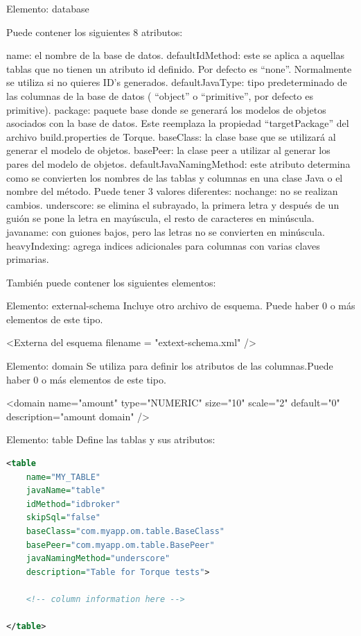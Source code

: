\documentclass[12pt, oneside]{article}
\begin{document}
Elemento: database

Puede contener los siguientes 8 atributos:

name: el nombre de la base de datos.
defaultIdMethod: este se aplica a aquellas tablas que no tienen un atributo id definido. Por defecto es “none”. Normalmente se utiliza si no quieres ID’s generados.
defaultJavaType: tipo predeterminado de las columnas de la base de datos ( “object” o “primitive”, por defecto es primitive).
package: paquete base donde se generará los modelos de objetos asociados con la base de datos. Este reemplaza la propiedad “targetPackage” del archivo build.properties de Torque.
baseClass: la clase base que se utilizará al generar el modelo de objetos.
basePeer: la clase peer a utilizar al generar los pares del modelo de objetos.
defaultJavaNamingMethod: este atributo determina como se convierten los nombres de las tablas y columnas en una clase Java o el nombre del método. Puede tener 3 valores diferentes:
nochange: no se realizan cambios.
underscore: se elimina el subrayado, la primera letra y después de un guión se pone la letra en mayúscula, el resto de caracteres en minúscula.
javaname: con guiones bajos, pero las letras no se convierten en minúscula.
heavyIndexing: agrega indices adicionales para columnas con varias claves primarias.

También puede contener los siguientes elementos:

Elemento: external-schema
Incluye otro archivo de esquema. Puede haber 0 o más elementos de este tipo.

<Externa del esquema
           		filename = "extext-schema.xml" />


Elemento: domain
Se utiliza para definir los atributos de las columnas.Puede haber 0 o más elementos de este tipo. 

<domain
           name="amount"
           type="NUMERIC"
           size="10"
           scale="2"
           default="0"
           description="amount domain" />

      
Elemento: table
Define las tablas y sus atributos:

\begin{lstlisting}[language=XML]
<table
	name="MY_TABLE"
	javaName="table"
	idMethod="idbroker"
	skipSql="false"
	baseClass="com.myapp.om.table.BaseClass"
	basePeer="com.myapp.om.table.BasePeer"
	javaNamingMethod="underscore"
	description="Table for Torque tests">

	<!-- column information here -->

</table>
\end{lstlisting}
\end{document}
